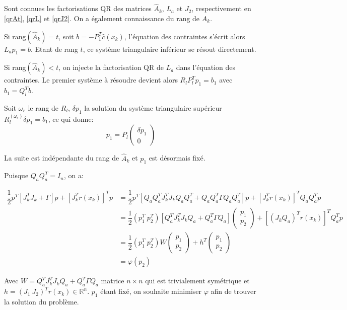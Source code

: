 \documentclass[a4paper,11pt]{article}
\newcommand{\ha}{\hat{A}}
\newcommand{\hc}{\hat{c}}
\numberwithin{equation}{section}
\begin{document}
Sont connues les factorisations QR des matrices $\ha_{k}$, $L_{a}$ et $J_{2}$, respectivement en \ref{qrAt}, \ref{qrL} et \ref{qrJ2}. On a également connaissance du rang de $\ha_{k}$.

Si rang$(\ha_{k})=t$, soit $b = -P_1^T\hc(x_{k})$, l'équation des contraintes s'écrit alors \\ $L_{a}p_1 = b$. Etant de rang $t$, ce système triangulaire inférieur se résout directement.

Si rang$(\ha_{k})<t$, on injecte la factorisation QR de $L_{a}$ dans l'équation des contraintes. Le premier système à résoudre devient alors $R_lP_l^Tp_1 = b_1$ avec $b_{1}=Q_l^{T}b$. 

Soit $\omega_{r}$ le rang de $R_l$, $\delta p_{1}$ la solution du système triangulaire supérieur $R_l^{(\omega_{r})}\delta p_{1} = b_{1}$, ce qui donne:
$$ p_{1} = P_l \begin{pmatrix} \delta p_{1} \\ 0 \end{pmatrix}$$

La suite est indépendante du rang de $\ha_{k}$ et $p_{1}$ est désormais fixé.

Puisque $Q_{a}Q_{a}^T = I_n$, on a:

$$
\begin{aligned} 
\dfrac{1}{2}p^T\left[J_{k}^TJ_{k} + \Gamma\right]p + \left[J_{k}^Tr(x_{k})\right]^Tp &= \dfrac{1}{2}p^T\left[Q_{a}Q_{a}^TJ_{k}^TJ_{k}Q_{a}Q_{a}^T + Q_{a}Q_{a}^T\Gamma Q_{a}Q_{a}^T\right]p + \left[J_{k}^Tr(x_{k})\right]^TQ_{a}Q_{a}^Tp \\
&= \dfrac{1}{2}(p_1^T\ p_2^T) \left[Q_{a}^TJ_{k}^TJ_{k}Q_{a} + Q_{a}^T\Gamma Q_{a}\right]\begin{pmatrix} p_1 \\ p_2\end{pmatrix} + \left[(J_{k}Q_{a})^Tr(x_{k})\right]^TQ_{a}^{T}p\\
&= \dfrac{1}{2}(p_1^T\ p_2^T)W\begin{pmatrix}p_1\\p_2\end{pmatrix} + h^T\begin{pmatrix}p_1\\p_2\end{pmatrix} \\
&= \varphi(p_2)
\end{aligned}
$$

Avec $W = Q_{a}^TJ_{k}^TJ_{k}Q_{a} + Q_{a}^T\Gamma Q_{a}$ matrice $n\times n$ qui est trivialement symétrique et $h = (J_1\ J_2)^Tr(x_{k}) \in \mathbb{R}^n$. $p_1$ étant fixé, on souhaite minimiser $\varphi$ afin de trouver la solution du problème.
\end{document}
